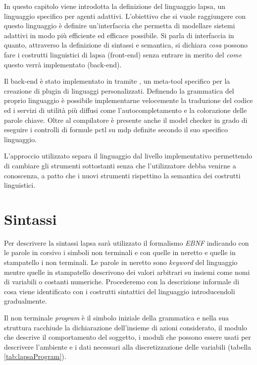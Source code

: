 In questo capitolo viene introdotta la definizione del linguaggio \ac{lapsa}, un linguaggio specifico per agenti adattivi. L'obiettivo che si vuole raggiungere con questo linguaggio è definire un'interfaccia che permetta di modellare sistemi adattivi in modo più efficiente ed efficace possibile. Si parla di interfaccia in quanto, attraverso la definizione di sintassi e semantica, si dichiara \emph{cosa} possono fare i costrutti linguistici di \ac{lapsa} (front-end) senza entrare in merito del \emph{come} questo verrà implementato (back-end).

Il back-end è stato implementato in \java{} tramite \xtext{} \cite{xtext}, un meta-tool specifico per la creazione di plugin \eclipse{} di linguaggi personalizzati. Definendo la grammatica del proprio linguaggio è possibile implementarne velocemente la traduzione del codice ed i servizi di utilità più diffusi come l'autocompletamento e la colorazione delle parole chiave. Oltre al compilatore è presente anche il model checker \prism{} in grado di eseguire i controlli di formule \ac{pctl} su \ac{mdp} definite secondo il suo specifico linguaggio.

L'approccio utilizzato separa il linguaggio dal livello implementativo permettendo di cambiare gli strumenti sottostanti senza che l'utilizzatore debba venirne a conoscenza, a patto che i nuovi strumenti rispettino la semantica dei costrutti linguistici.

\section{Sintassi}
Per descrivere la sintassi \ac{lapsa} sarà utilizzato il formalismo \emph{EBNF} indicando con le parole in corsivo i simboli non terminali e con quelle in neretto e quelle in stampatello i non terminali. Le parole in neretto sono \emph{keyword} del linguaggio mentre quelle in stampatello descrivono dei valori arbitrari su insiemi come nomi di variabili o costanti numeriche. Procederemo con la descrizione informale di cosa viene identificato con i costrutti sintattici del linguaggio introducendoli gradualmente.

Il non terminale \emph{program} è il simbolo iniziale della grammatica e nella sua struttura racchiude la dichiarazione dell'insieme di azioni considerato, il modulo che descrive il comportamento del soggetto, i moduli che possono essere usati per descrivere l'ambiente e i dati necessari alla discretizzazione delle variabili (tabella \ref{tab:lapsaProgram}).


